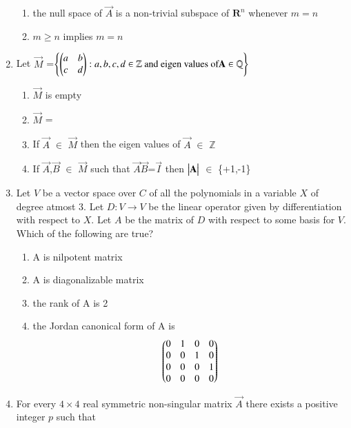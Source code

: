 \begin{enumerate}[label=\thesection.\arabic*.,ref=\thesection.\theenumi]
\begin{enumerate}
		\item the null space of $\vec{A}$ is a non-trivial subspace of $\mathbf{R}^{n}$ whenever $m=n$
		\item $m\geq n$ implies $m=n$
	\end{enumerate}
%
\solution

\item Let $\vec{M}$ =$\left\{\begin{pmatrix}a&b\\c&d\end{pmatrix} : a,b,c,d \in \mathbb{Z} \text{ and eigen values of} \mathbf{A} \in \mathbb{Q}\right\}$ \label{main}
\begin{enumerate}
    \item $\vec{M}$ is empty
    \item $\vec{M}$ =
    \item If $\vec{A}$ $\in$ $\vec{M}$ then the eigen values of $\vec{A}$ $\in$ $\mathbb{Z}$
    \item If $\vec{A}$,$\vec{B}$ $\in$ $\vec{M}$ such that $\vec{A} \vec{B}$=$\vec{I}$ then $\begin{vmatrix}\mathbf{A}\end{vmatrix}$ $\in$ \{+1,-1\}
\end{enumerate}
%
\solution

\item Let $V$ be a vector space over $C$ of all the polynomials in a variable $X$ of degree atmost 3. Let $D:V \xrightarrow{} V$ be the linear operator given by differentiation with respect to $X$. Let $A$ be the matrix of $D$ with respect to some 
basis for $V$. Which of the following are true? \\
\begin{enumerate}
\item A is nilpotent matrix \\
\item A is diagonalizable matrix \\ 
\item the rank of A is 2 \\
\item the Jordan canonical form of A is
\begin{align}\nonumber
    \begin{pmatrix}0&1&0&0\\
       0&0&1&0\\
       0&0&0&1\\
       0&0&0&0\end{pmatrix}
\end{align}
\end{enumerate}
%
\solution

\item For every $4 \times 4$ real symmetric non-singular matrix $\vec{A}$ there 
exists a positive integer $p$ such that


\end{enumerate}

